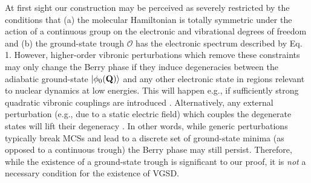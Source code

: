 \documentclass[superscriptaddress,showpacs,amsmath,amssymb,pra,twocolumn]{revtex4-1}
\begin{document}
At first sight our construction may be perceived as severely restricted
by the conditions that (a) the molecular Hamiltonian is totally symmetric
under the action of a continuous group on the electronic and vibrational
degrees of freedom and (b) the ground-state trough $\mathcal{O}$
has the electronic spectrum described by Eq. 1. However, higher-order vibronic perturbations
which remove these constraints may only change the Berry phase if
they induce degeneracies between the adiabatic ground-state $\ket{\phi_{0}(\mathbf{Q})}$
and any other electronic state in regions relevant to nuclear dynamics
at low energies. This will happen e.g., if sufficiently strong quadratic
vibronic couplings are introduced \cite{zwanziger_topological_1987,koizumi_multiconical_1999,koizumi_multiple_2000}. Alternatively, any external perturbation (e.g., due to a static electric field) which couples the degenerate states will lift their degeneracy \cite{bersuker_jahn-teller_2006}. In other words, while generic perturbations typically break MCSs and lead to a discrete set of ground-state minima (as opposed to a continuous trough) \cite{zwanziger_topological_1987,koizumi_multiconical_1999,koizumi_multiple_2000,bersuker_jahn-teller_2006} the Berry phase may still persist. Therefore, while the existence of a ground-state trough is significant to our proof, it is \textit{not} a necessary condition for the existence of VGSD.
\end{document}
